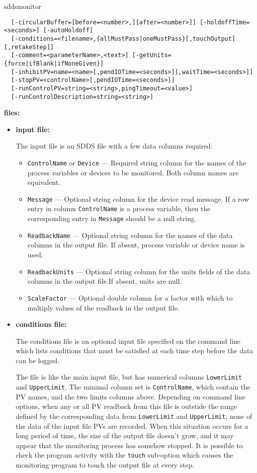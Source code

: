 \begin{sddsprog}{sddsmonitor}
\begin{verbatim}
  [-circularBuffer=[before=<number>,][after=<number>]] [-holdoffTime=<seconds>] [-autoHoldoff]
  [-conditions=<filename>,{allMustPass|oneMustPass}[,touchOutput][,retakeStep]]
  [-comment=<parameterName>,<text>] [-getUnits={force|ifBlank|ifNoneGiven}]
  [-inhibitPV=name=<name>[,pendIOTime=<seconds>][,waitTime=<seconds>]]
  [-stopPV=<controlName>[,pendIOTime=<seconds>]]
  [-runControlPV=string=<string>,pingTimeout=<value>]
  [-runControlDescription=string=<string>]
\end{verbatim}
\item \textbf{files:}
\begin{itemize}
  \item \textbf{input file:}\par
The input file is an SDDS file with a few data columns required:
  \begin{itemize}
    \item {\tt ControlName} or {\tt Device} --- Required string column for the names of the process variables
                or devices to be monitored. Both column names are equivalent.
    \item {\tt Message} --- Optional string column for the device read message. If a row entry in
                column {\tt ControlName} is a process variable, then the corresponding entry
                in {\tt Message} should be a null string.
    \item {\tt ReadbackName} --- Optional string column for the names of the data columns in the
                output file. If absent, process variable or device name is used.
    \item {\tt ReadbackUnits} --- Optional string column for the units fields of the data columns in the
                output file.If absent, units are null.
    \item {\tt ScaleFactor} --- Optional double column for a factor with which to multiply
                values of the readback in the output file.
  \end{itemize}

  \item \textbf{conditions file:} \par
The conditions file is an optional input file specified on the command line which lists
conditions that must be satisfied at each time step before the data can be logged.

The file is like the main input file, but has numerical columns \verb+LowerLimit+ and \verb+UpperLimit+.
The minimal column set is \verb+ControlName+, which contain the PV names, and the two limits columns above.
Depending on command line options, when any or all PV readback from this file
is outstide the range defined by the corresponding data from \verb+LowerLimit+ and \verb+UpperLimit+,
none of the data of the input file PVs are recorded.
When this situation occurs for a long period of time, the size of the output file doesn't
grow, and it may appear that the monitoring process has somehow stopped.
It is possible to check the program activity with the \verb+touch+ sub-option
which causes the monitoring program to touch the output file at every step.


\end{itemize}
\end{sddsprog}
